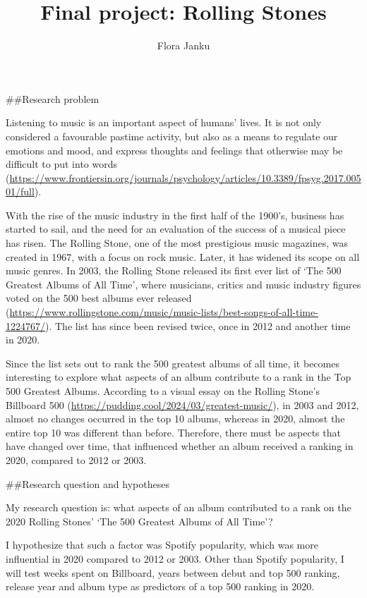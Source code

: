 \documentclass[
]{article}
\title{Final project: Rolling Stones}
\author{Flora Janku}
\date{}
\begin{document}
\maketitle

\#\#Research problem

Listening to music is an important aspect of humans' lives. It is not
only considered a favourable pastime activity, but also as a means to
regulate our emotions and mood, and express thoughts and feelings that
otherwise may be difficult to put into words
(\url{https://www.frontiersin.org/journals/psychology/articles/10.3389/fpsyg.2017.00501/full}).

With the rise of the music industry in the first half of the 1900's,
business has started to sail, and the need for an evaluation of the
success of a musical piece has risen. The Rolling Stone, one of the most
prestigious music magazines, was created in 1967, with a focus on rock
music. Later, it has widened its scope on all music genres. In 2003, the
Rolling Stone released its first ever list of `The 500 Greatest Albums
of All Time', where musicians, critics and music industry figures voted
on the 500 best albums ever released
(\url{https://www.rollingstone.com/music/music-lists/best-songs-of-all-time-1224767/}).
The list has since been revised twice, once in 2012 and another time in
2020.

Since the list sets out to rank the 500 greatest albums of all time, it
becomes interesting to explore what aspects of an album contribute to a
rank in the Top 500 Greatest Albums. According to a visual essay on the
Rolling Stone's Billboard 500
(\url{https://pudding.cool/2024/03/greatest-music/}), in 2003 and 2012,
almost no changes occurred in the top 10 albums, whereas in 2020, almost
the entire top 10 was different than before. Therefore, there must be
aspects that have changed over time, that influenced whether an album
received a ranking in 2020, compared to 2012 or 2003.

\#\#Research question and hypotheses

My research question is: what aspects of an album contributed to a rank
on the 2020 Rolling Stones' `The 500 Greatest Albums of All Time'?

I hypothesize that such a factor was Spotify popularity, which was more
influential in 2020 compared to 2012 or 2003. Other than Spotify
popularity, I will test weeks spent on Billboard, years between debut
and top 500 ranking, release year and album type as predictors of a top
500 ranking in 2020.
\end{document}
